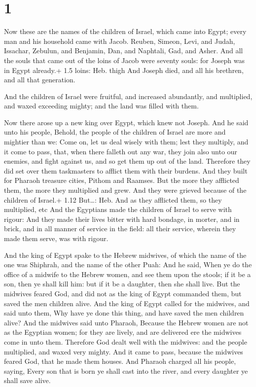 \hypertarget{section}{%
\section{1}\label{section}}

 Now these are the names of the children of Israel, which
came into Egypt; every man and his household came with Jacob.
 Reuben, Simeon, Levi, and Judah,  Issachar,
Zebulun, and Benjamin,  Dan, and Naphtali, Gad, and Asher.
 And all the souls that came out of the loins of Jacob were
seventy souls: for Joseph was in Egypt already.+ 1.5 loins: Heb. thigh
 And Joseph died, and all his brethren, and all that
generation.

 And the children of Israel were fruitful, and increased
abundantly, and multiplied, and waxed exceeding mighty; and the land was
filled with them.

 Now there arose up a new king over Egypt, which knew not
Joseph.  And he said unto his people, Behold, the people of
the children of Israel are more and mightier than we:  Come
on, let us deal wisely with them; lest they multiply, and it come to
pass, that, when there falleth out any war, they join also unto our
enemies, and fight against us, and so get them up out of the land.
 Therefore they did set over them taskmasters to afflict
them with their burdens. And they built for Pharaoh treasure cities,
Pithom and Raamses.  But the more they afflicted them, the
more they multiplied and grew. And they were grieved because of the
children of Israel.+ 1.12 But\ldots: Heb. And as they afflicted them, so
they multiplied, etc  And the Egyptians made the children
of Israel to serve with rigour:  And they made their lives
bitter with hard bondage, in morter, and in brick, and in all manner of
service in the field: all their service, wherein they made them serve,
was with rigour.

 And the king of Egypt spake to the Hebrew midwives, of
which the name of the one was Shiphrah, and the name of the other Puah:
 And he said, When ye do the office of a midwife to the
Hebrew women, and see them upon the stools; if it be a son, then ye
shall kill him: but if it be a daughter, then she shall live.
 But the midwives feared God, and did not as the king of
Egypt commanded them, but saved the men children alive. 
And the king of Egypt called for the midwives, and said unto them, Why
have ye done this thing, and have saved the men children alive?
 And the midwives said unto Pharaoh, Because the Hebrew
women are not as the Egyptian women; for they are lively, and are
delivered ere the midwives come in unto them.  Therefore
God dealt well with the midwives: and the people multiplied, and waxed
very mighty.  And it came to pass, because the midwives
feared God, that he made them houses.  And Pharaoh charged
all his people, saying, Every son that is born ye shall cast into the
river, and every daughter ye shall save alive.

